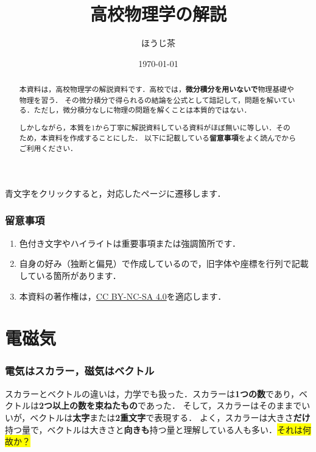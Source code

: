 \documentclass[a4paper,11pt]{ltjsarticle}
\title{高校物理学の解説}
\author{ほうじ茶}
\date{\today}
\begin{document}
\maketitle

\begin{abstract}
  本資料は，高校物理学の解説資料です．高校では，\textbf{微分積分を用いないで}物理基礎や物理を習う．
  その微分積分で得られるの結論を公式として諳記して，問題を解いている．ただし，微分積分なしに物理の問題を解くことは本質的ではない．
  
  しかしながら，本質を1から丁寧に解説資料している資料がほぼ無いに等しい．そのため，本資料を作成することにした．
  以下に記載している\textbf{留意事項}をよく読んでからご利用ください．
\end{abstract}

\tableofcontents

\vspace{12pt}

\begin{center}
  {\color{blue}青文字}をクリックすると，対応したページに遷移します．
\end{center}

\section*{留意事項}

\begin{enumerate}
  \item 色付き文字やハイライトは重要事項または強調箇所です．
  \item 自身の好み（独断と偏見）で作成しているので，旧字体や座標を行列で記載している箇所があります．
  \item 本資料の著作権は，\href{https://creativecommons.org/licenses/by-nc-sa/4.0}{CC BY-NC-SA 4.0}を適応します．
\end{enumerate}

\clearpage

\part{電磁気}

\section{電気はスカラー，磁気はベクトル}

スカラーとベクトルの違いは，力学でも扱った．スカラーは\textbf{1つの数}であり，ベクトルは\textbf{2つ以上の数を束ねたもの}であった．
そして，スカラーはそのままでいいが，ベクトルは\textbf{太字}または\textbf{2重文字}で表現する．
よく，スカラーは大きさ\textbf{だけ}持つ量で，ベクトルは大きさと\textbf{向きも}持つ量と理解している人も多い．\colorbox{yellow}{それは何故か？}
\end{document}
